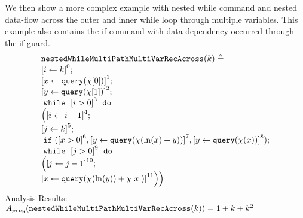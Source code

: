                             \begin{example}
                                We then show a more complex example with nested while command and nested data-flow across the outer and inner while loop through multiple variables.
                                This example also contains the if command with data dependency occurred through the if guard.
                                \[
                                \begin{array}{l}
                                \kw{nestedWhileMultiPathMultiVarRecAcross}(k) \triangleq \\
                                    \clabel{\assign{i}{k} }^{0} ; \\
                                    \clabel{ \assign{x}{\query(\chi[0])}}^{1} ; \\
                                    \clabel{ \assign{y}{\query(\chi[1])}}^{2} ; \\
                                        \ewhile ~ \clabel{i > 0}^{3} ~ \edo ~ \\
                                        \Big(
                                         \clabel{\assign{i}{i-1}}^{4} ;\\
                                         \clabel{\assign{j}{k}}^{5} ;\\
                                         \eif(\clabel{x > 0}^6, \clabel{\assign{y}{\query(\chi(\ln(x) + y))} }^{7},
                                         \clabel{\assign{y}{\query(\chi(x))} }^{8} )
                                          ; \\
                                         \ewhile ~ \clabel{j > 0}^{9} ~ \edo ~ \\
                                         \Big(
                                          \clabel{\assign{j}{j-1}}^{10};\\
                                          \clabel{\assign{x}{\query(\chi(\ln(y))+\chi[x])} }^{11}
                                          \Big) \Big)
                                    \end{array}
                                \]
                                Analysis Results: $ A_{{prog}}(\mathtt{nestedWhileMultiPathMultiVarRecAcross}(k)) = 1 + k + k^2$

\end{example}
